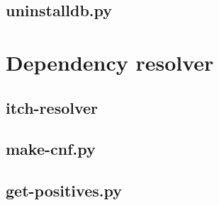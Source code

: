 \documentclass[10pt]{article}
\begin{document}
\subsection{uninstalldb.py}


\section{Dependency resolver}

\subsection{itch-resolver}


\subsection{make-cnf.py}


\subsection{get-positives.py}


\pagebreak
\printbibliography
\end{document}
